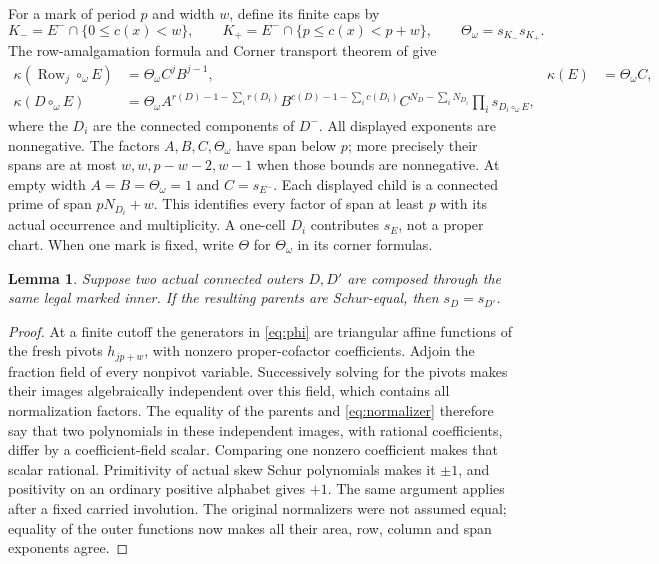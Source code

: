 \documentclass[11pt,a4paper]{amsart}
\numberwithin{equation}{section}
\theoremstyle{plain}
\newtheorem{lemma}[theorem]{Lemma}
\theoremstyle{definition}
\newcommand{\Row}{\operatorname{Row}}
\begin{document}
For a mark of period \(p\) and width \(w\), define its finite caps by
\[
 K_-=E^-\cap\{0\le c(x)<w\},\qquad
 K_+=E^-\cap\{p\le c(x)<p+w\},\qquad
 \Theta_\omega=s_{K_-}s_{K_+}.
\]
The row-amalgamation formula and Corner transport theorem of
\cite{Shields2026CornerDescent} give
\begin{equation}\label{eq:exact-corner-transport}
 \begin{aligned}
 \kappa(\Row_j\circ_\omega E)&=\Theta_\omega C^jB^{j-1},
 &\kappa(E)&=\Theta_\omega C,\\
 \kappa(D\circ_\omega E)&=
 \Theta_\omega A^{r(D)-1-\sum_i r(D_i)}
 B^{c(D)-1-\sum_i c(D_i)}C^{N_D-\sum_iN_{D_i}}
 \prod_i s_{D_i\circ_\omega E},
 \end{aligned}
\end{equation}
where the \(D_i\) are the connected components of \(D^-\).  All displayed
exponents are nonnegative.  The factors \(A,B,C,\Theta_\omega\) have
span below \(p\); more precisely their spans are at most \(w,w,p-w-2,w-1\)
when those bounds are nonnegative.  At empty width \(A=B=\Theta_\omega=1\)
and \(C=s_{E^-}\).  Each displayed child is a connected prime of span
\(pN_{D_i}+w\).  This identifies every factor of span at least \(p\) with its
actual occurrence and multiplicity.  A one-cell \(D_i\) contributes \(s_E\),
not a proper chart.  When one mark is fixed, write \(\Theta\) for
\(\Theta_\omega\) in its corner formulas.

\begin{lemma}\label{lem:faithful}
Suppose two actual connected outers \(D,D'\) are composed through the same
legal marked inner.  If the resulting parents are Schur-equal, then
\(s_D=s_{D'}\).
\end{lemma}
\begin{proof}
At a finite cutoff the generators in \eqref{eq:phi} are triangular affine
functions of the fresh pivots \(h_{jp+w}\), with nonzero proper-cofactor
coefficients.  Adjoin the fraction field of every nonpivot variable.
Successively solving for the pivots makes their images algebraically
independent over this field, which contains all normalization factors.
The equality of the parents and \eqref{eq:normalizer} therefore say that two
polynomials in these independent images, with rational coefficients, differ
by a coefficient-field scalar.  Comparing one nonzero coefficient makes that
scalar rational.  Primitivity of actual skew Schur polynomials makes it \(\pm1\),
and positivity on an ordinary positive alphabet gives \(+1\).
The same argument applies after a fixed carried involution.  The original
normalizers were not assumed equal; equality of the outer functions now
makes all their area, row, column and span exponents agree.
\end{proof}
\end{document}
